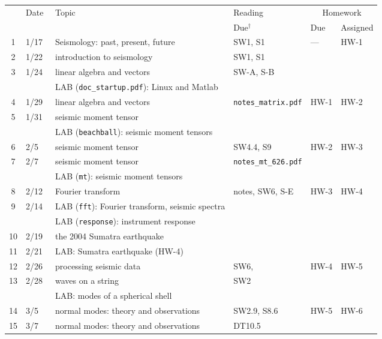 \documentclass[10pt,titlepage,fleqn]{article}
\newcommand{\xxa}{1/17}
\newcommand{\xxb}{1/22}
\newcommand{\xxc}{1/24}
\newcommand{\xxd}{1/29}
\newcommand{\xxe}{1/31}
\newcommand{\xxf}{2/5}
\newcommand{\xxg}{2/7}
\newcommand{\xxh}{2/12}
\newcommand{\xxi}{2/14}
\newcommand{\xxj}{2/19}
\newcommand{\xxk}{2/21}
\newcommand{\xxl}{2/26}
\newcommand{\xxm}{2/28}
\newcommand{\xxn}{3/5}
\newcommand{\xxo}{3/7}
\begin{document}
\begin{enumerate}
\hspace{-1cm}
\begin{tabular}{cl|l|l|ll}
\hline
   & Date    & Topic & Reading & \multicolumn{2}{c}{Homework} \\
   &         &       & Due$^\dagger$     & Due & Assigned \\ \hline\hline
1  & \xxa\   & Seismology: past, present, future & SW1, S1 & --- & HW-1 \\
\hline
2  & \xxb\   & introduction to seismology & SW1, S1 & & \\
3  & \xxc\   & linear algebra and vectors & SW-A, S-B & & \\
   &         & LAB (\verb+doc_startup.pdf+): Linux and Matlab & & & \\
\hline
4  & \xxd\   & linear algebra and vectors & \verb+notes_matrix.pdf+ & HW-1 & HW-2 \\
5  & \xxe\   & seismic moment tensor & & \\
   &         & LAB (\verb+beachball+): seismic moment tensors & & & \\
\hline
6  & \xxf\   & seismic moment tensor & SW4.4, S9 & HW-2 & HW-3 \\
7  & \xxg\   & seismic moment tensor & \verb+notes_mt_626.pdf+ & & \\
   &         & LAB (\verb+mt+): seismic moment tensors & & & \\
\hline
8  & \xxh\   & Fourier transform & notes, SW6, S-E & HW-3 & HW-4\\
9  & \xxi\   & LAB (\verb+fft+): Fourier transform, seismic spectra & & \\
   &         & LAB (\verb+response+): instrument response & & \\
\hline
10 & \xxj\   & the 2004 Sumatra earthquake & \cite{Lay2005,Ammon2005,Park2005,Ni2005} & & \\
11 & \xxk\   & LAB: Sumatra earthquake (HW-4) & & \\
\hline
12 & \xxl\   & processing seismic data & SW6, \cite{ReyesWest2011} & HW-4 & HW-5 \\
13 & \xxm\   & waves on a string & SW2 & & \\
   &         & LAB: modes of a spherical shell  & & \\
\hline
14 & \xxn\   & normal modes: theory and observations & SW2.9, S8.6 & HW-5 & HW-6 \\
15 & \xxo\   & normal modes: theory and observations & DT10.5 & & \\

\end{tabular}
\end{enumerate}
\end{document}

